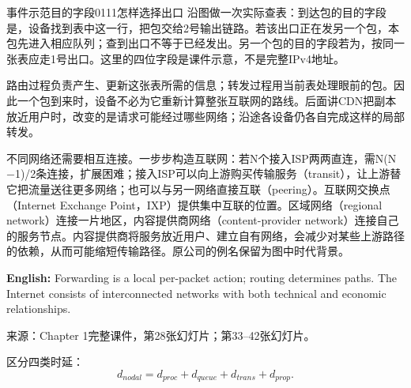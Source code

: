 

\begin{StudyBlock}{事件示范}{目的字段0111怎样选择出口}
沿图做一次实际查表：到达包的目的字段是，设备找到表中这一行，把包交给2号输出链路。若该出口正在发另一个包，本包先进入相应队列；查到出口不等于已经发出。另一个包的目的字段若为，按同一张表应走1号出口。这里的四位字段是课件示意，不是完整IPv4地址。
\end{StudyBlock}


路由过程负责产生、更新这张表所需的信息；转发过程用当前表处理眼前的包。因此一个包到来时，设备不必为它重新计算整张互联网的路线。后面讲CDN把副本放近用户时，改变的是请求可能经过哪些网络；沿途各设备仍各自完成这样的局部转发。


不同网络还需要相互连接。一步步构造互联网：若N个接入ISP两两直连，需N(N\ensuremath{-}1)/2条连接，扩展困难；接入ISP可以向上游购买传输服务（transit），让上游替它把流量送往更多网络；也可以与另一网络直接互联（peering）。互联网交换点（Internet Exchange Point，IXP）提供集中互联的位置。区域网络（regional network）连接一片地区，内容提供商网络（content-provider network）连接自己的服务节点。内容提供商将服务放近用户、建立自有网络，会减少对某些上游路径的依赖，从而可能缩短传输路径。原公司的例名保留为图中时代背景。




\textbf{English:} Forwarding is a local per-packet action; routing determines paths. The Internet consists of interconnected networks with both technical and economic relationships.


来源：Chapter 1完整课件，第28张幻灯片；第33–42张幻灯片。








区分四类时延：
\[
d_{nodal}=d_{proc}+d_{queue}+d_{trans}+d_{prop}.\tag{1.2}
\]


